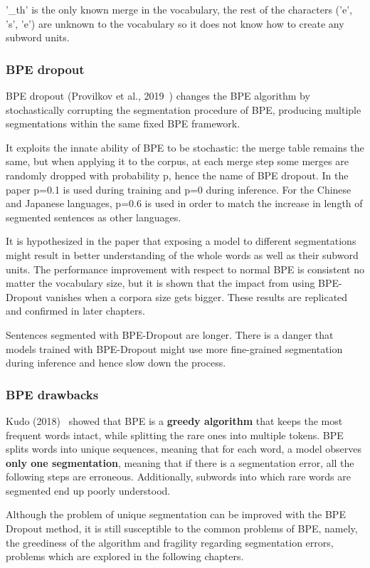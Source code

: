 '\_th' is the only known merge in the vocabulary, the rest of the characters ('e', 's', 'e') are unknown to the vocabulary so it does not know how to create any subword units.

\subsubsection{BPE dropout}

BPE dropout (Provilkov et al., 2019~\cite{provilkov2019bpedropout}) changes the BPE algorithm by stochastically corrupting the segmentation procedure of BPE, producing multiple segmentations within the same fixed BPE framework.

It exploits the innate ability of BPE to be stochastic: the merge table remains the same, but when applying it to the corpus, at each merge step some merges are randomly dropped with probability p, hence the name of BPE dropout. In the paper p=0.1 is used during training and p=0 during inference. For the Chinese and Japanese languages, p=0.6 is used in order to match the increase in length of segmented sentences as other languages.

It is hypothesized in the paper that exposing a model to different segmentations might result in better understanding of the whole words as well as their subword units. The performance improvement with respect to normal BPE is consistent no matter the vocabulary size, but it is shown that the impact from using BPE-Dropout vanishes when a corpora size gets bigger. These results are replicated and confirmed in later chapters.

Sentences segmented with BPE-Dropout are longer. There is a danger that models trained with BPE-Dropout might use more fine-grained segmentation during inference and hence slow down the process.

\subsubsection{BPE drawbacks}

Kudo (2018)~\cite{kudo-2018-subword} showed that BPE is a \textbf{greedy algorithm} that keeps the most frequent words intact, while splitting the rare ones into multiple tokens. BPE splits words into unique sequences, meaning that for each word, a model observes \textbf{only one segmentation}, meaning that if there is a segmentation error, all the following steps are erroneous. Additionally, subwords into which rare words are segmented end up poorly understood.

Although the problem of unique segmentation can be improved with the BPE Dropout method, it is still susceptible to the common problems of BPE, namely, the greediness of the algorithm and fragility regarding segmentation errors, problems which are explored in the following chapters.
